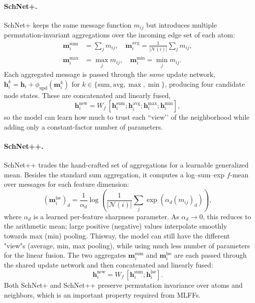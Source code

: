 \documentclass[sigconf, nonacm]{acmart}
\begin{document}
\paragraph{SchNet+.}
SchNet+ keeps the same message function $m_{ij}$ but introduces multiple permutation-invariant aggregations over the incoming edge set of each atom:
\begin{align}
	\mathbf{m}_i^{\text{sum}} &= \sum_{j} m_{ij}, \quad
	\mathbf{m}_i^{\text{avg}} = \frac{1}{|\mathcal{N}(i)|}\sum_{j} m_{ij},\\
	\mathbf{m}_i^{\max} &= \max_{j} m_{ij}, \quad
	\mathbf{m}_i^{\min} = \min_{j} m_{ij}.
\end{align}
Each aggregated message is passed through the \emph{same} update network,
$\mathbf{h}_i^{k} = \mathbf{h}_i + \phi_{\text{upd}}(\mathbf{m}_i^{k})$ for
$k\in\{\text{sum},\text{avg},\max,\min\}$, producing four candidate node states.
These are concatenated and linearly fused,
\begin{equation}
	\mathbf{h}_i^{\text{new}} = W_f\,[\mathbf{h}_i^{\text{sum}};\mathbf{h}_i^{\text{avg}};\mathbf{h}_i^{\max};\mathbf{h}_i^{\min}],
\end{equation}
so the model can learn how much to trust each “view’’ of the neighborhood while adding only a constant-factor number of parameters.

\paragraph{SchNet++.}
SchNet++ trades the hand-crafted set of aggregations for a learnable generalized mean. Besides the standard sum aggregation, it computes a log–sum–exp $f$-mean over messages for each feature dimension:
\begin{equation}
	(\mathbf{m}_i^{\text{lse}})_d =
	\frac{1}{\alpha_d}\log\left(\frac{1}{|\mathcal{N}(i)|}\sum_j
	\exp(\alpha_d (m_{ij})_d)\right),
\end{equation}
where $\alpha_d$ is a learned per-feature sharpness parameter. As $\alpha_d\to 0$, this reduces to the arithmetic mean; large positive (negative) values interpolate smoothly towards max (min) pooling. Thisway, the model can still have the different "view"s (average, min, max pooling), while using much less number of parameters for the linear fusion. The two aggregates $\mathbf{m}_i^{\text{sum}}$ and $\mathbf{m}_i^{\text{lse}}$ are each passed through the shared update network and then concatenated and linearly fused:
\begin{equation}
	\mathbf{h}_i^{\text{new}} = W_f\,[\mathbf{h}_i^{\text{sum}};\mathbf{h}_i^{\text{lse}}].
\end{equation}
Both SchNet+ and SchNet++ preserve permutation invariance over atoms and neighbors, which is an important property required from MLFFs.
\end{document}
